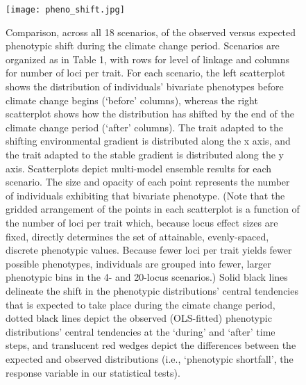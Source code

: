 \documentclass[9pt,twocolumn,twoside,lineno]{pnas-new}
\begin{document}
\begin{figure}
\centering
\texttt{[image: pheno\_shift.jpg]}
\caption{Comparison, across all 18 scenarios, of the observed versus expected phenotypic shift during the climate change period. Scenarios are organized as in Table 1, with rows for level of linkage and columns for number of loci per trait. For each scenario, the left scatterplot shows the distribution of individuals’ bivariate phenotypes before climate change begins (‘before’ columns), whereas the right scatterplot shows how the distribution has shifted by the end of the climate change period (‘after’ columns). The trait adapted to the shifting environmental gradient is distributed along the x axis, and the trait adapted to the stable gradient is distributed along the y axis. Scatterplots depict multi-model ensemble results for each scenario. The size and opacity of each point represents the number of individuals exhibiting that bivariate phenotype. (Note that the gridded arrangement of the points in each scatterplot is a function of the number of loci per trait which, because locus effect sizes are fixed, directly determines the set of attainable, evenly-spaced, discrete phenotypic values. Because fewer loci per trait yields fewer possible phenotypes, individuals are grouped into fewer, larger phenotypic bins in the 4- and 20-locus scenarios.) Solid black lines delineate the shift in the phenotypic distributions’ central tendencies that is expected to take place during the cimate change period, dotted black lines depict the observed (OLS-fitted) phenotypic distributions’ central tendencies at the ‘during’ and ‘after’ time steps, and translucent red wedges depict the differences between the expected and observed distributions (i.e., ‘phenotypic shortfall’, the response variable in our statistical tests).
}
\label{fig:pheno_shift}
\end{figure}
\end{document}
